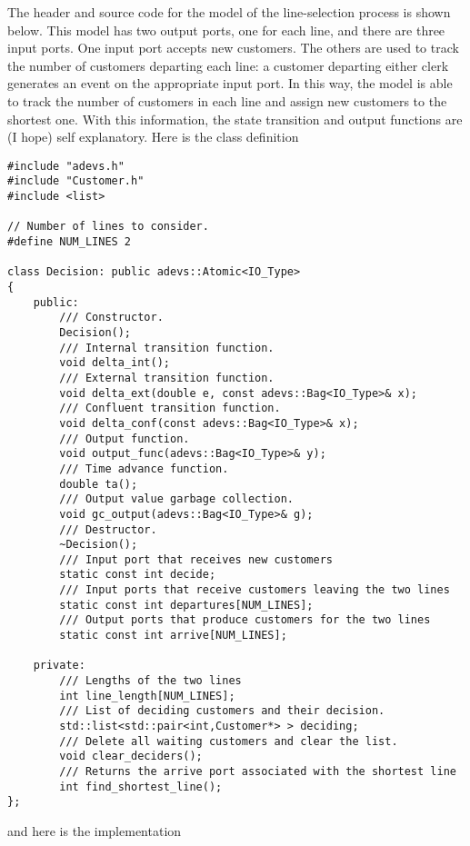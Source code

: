 The header and source code for the model of the line-selection process is shown below. This model has two output ports, one for each line, and there are three input ports. One input port accepts new customers. The others are used to track the number of customers departing each line: a customer departing either clerk generates an event on the appropriate input port. In this way, the model is able to track the number of customers in each line and assign new customers to the shortest one. With this information, the state transition and output functions are (I hope) self explanatory. Here is the class definition
\begin{verbatim}
#include "adevs.h"
#include "Customer.h"
#include <list>

// Number of lines to consider.
#define NUM_LINES 2

class Decision: public adevs::Atomic<IO_Type>
{
    public:
        /// Constructor.
        Decision();
        /// Internal transition function.
        void delta_int();
        /// External transition function.
        void delta_ext(double e, const adevs::Bag<IO_Type>& x);
        /// Confluent transition function.
        void delta_conf(const adevs::Bag<IO_Type>& x);
        /// Output function.  
        void output_func(adevs::Bag<IO_Type>& y);
        /// Time advance function.
        double ta();
        /// Output value garbage collection.
        void gc_output(adevs::Bag<IO_Type>& g);
        /// Destructor.
        ~Decision();
        /// Input port that receives new customers
        static const int decide;
        /// Input ports that receive customers leaving the two lines
        static const int departures[NUM_LINES];
        /// Output ports that produce customers for the two lines
        static const int arrive[NUM_LINES];

    private:
        /// Lengths of the two lines
        int line_length[NUM_LINES];
        /// List of deciding customers and their decision.
        std::list<std::pair<int,Customer*> > deciding;
        /// Delete all waiting customers and clear the list.
        void clear_deciders();
        /// Returns the arrive port associated with the shortest line
        int find_shortest_line();
};
\end{verbatim}
and here is the implementation
